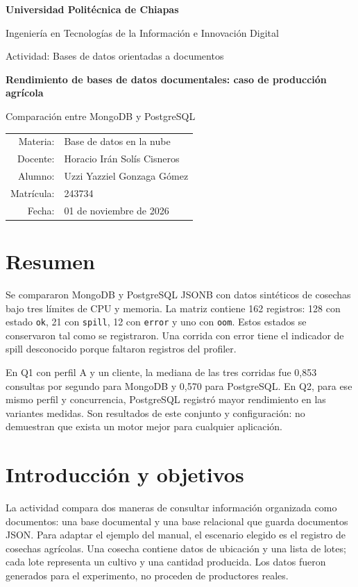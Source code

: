 \documentclass[12pt,letterpaper]{article}
\begin{document}
\begin{titlepage}\centering
{\Large\bfseries Universidad Politécnica de Chiapas\par}\vspace{0.5cm}
{\large Ingeniería en Tecnologías de la Información e Innovación Digital\par}
\vfill
{\large Actividad: Bases de datos orientadas a documentos\par}\vspace{0.9cm}
{\LARGE\bfseries Rendimiento de bases de datos documentales: caso de producción agrícola\par}\vspace{0.5cm}
{\large Comparación entre MongoDB y PostgreSQL\par}
\vfill
\begin{tabular}{rl}
Materia: & Base de datos en la nube \\
Docente: & Horacio Irán Solís Cisneros \\
Alumno: & Uzzi Yazziel Gonzaga Gómez \\
Matrícula: & 243734 \\
Fecha: & 01 de noviembre de 2026
\end{tabular}
\vspace{2cm}\end{titlepage}
\tableofcontents\clearpage\listoftables\listoffigures\clearpage{}

\section*{Resumen}
Se compararon MongoDB y PostgreSQL JSONB con datos sintéticos de cosechas bajo tres límites de CPU y memoria. La matriz contiene 162 registros: 128 con estado \texttt{ok}, 21 con \texttt{spill}, 12 con \texttt{error} y uno con \texttt{oom}. Estos estados se conservaron tal como se registraron. Una corrida con error tiene el indicador de spill desconocido porque faltaron registros del profiler.

En Q1 con perfil A y un cliente, la mediana de las tres corridas fue 0,853 consultas por segundo para MongoDB y 0,570 para PostgreSQL. En Q2, para ese mismo perfil y concurrencia, PostgreSQL registró mayor rendimiento en las variantes medidas. Son resultados de este conjunto y configuración: no demuestran que exista un motor mejor para cualquier aplicación.


\section*{Introducción y objetivos}
La actividad compara dos maneras de consultar información organizada como documentos: una base documental y una base relacional que guarda documentos JSON. Para adaptar el ejemplo del manual, el escenario elegido es el registro de cosechas agrícolas. Una cosecha contiene datos de ubicación y una lista de lotes; cada lote representa un cultivo y una cantidad producida. Los datos fueron generados para el experimento, no proceden de productores reales.
\end{document}

